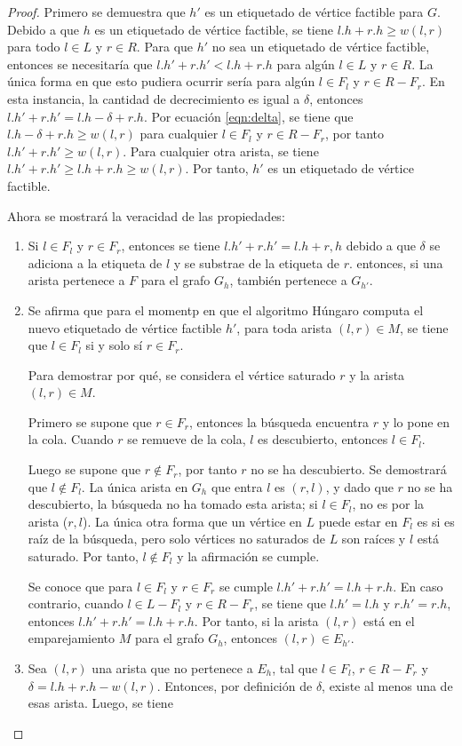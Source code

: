 \documentclass[10pt]{article} %
\begin{document}
	\begin{proof}
		Primero se demuestra que $h'$ es un etiquetado de v\'ertice factible para $G$. Debido a que $h$ es un etiquetado de v\'ertice factible, se tiene $l.h + r.h \geq w(l,r)$ para todo $l \in L$ y $r \in R$. Para que $h'$ no sea un etiquetado de v\'ertice factible, entonces se necesitar\'ia que $l.h' + r.h' < l.h + r.h$ para alg\'un $l \in L$ y $r \in R$. La \'unica forma en que esto pudiera ocurrir ser\'ia para alg\'un $l \in F_l$ y $r \in R-F_r$. En esta instancia, la cantidad de decrecimiento es igual a $\delta$, entonces $l.h' + r.h' = l.h - \delta + r.h$. Por ecuaci\'on \ref{eqn:delta}, se tiene que $l.h - \delta + r.h \geq w(l,r)$ para cualquier $l \in F_l$ y $r \in R - F_r$, por tanto $l.h' + r.h' \geq w(l,r)$. Para cualquier otra arista, se tiene $l.h' + r.h' \geq l.h + r.h \geq w(l,r)$. Por tanto, $h'$ es un etiquetado de v\'ertice factible.
		
		Ahora se mostrar\'a la veracidad de las propiedades:
		\begin{enumerate}
			\item Si $l \in F_l$ y $r \in F_r$, entonces se tiene $l.h' + r.h' = l.h + r,h$ debido a que $\delta$ se adiciona a la etiqueta de $l$ y se substrae de la etiqueta de $r$. entonces, si una arista pertenece a $F$ para el grafo $G_h$, tambi\'en pertenece a $G_{h'}$.
			\item Se afirma que para el momentp en que el algoritmo H\'ungaro computa el nuevo etiquetado de v\'ertice factible $h'$, para toda arista $(l,r) \in M$, se tiene que $l \in F_l$ si y solo s\'i $r \in F_r$. 
			
			Para demostrar por qu\'e, se considera el v\'ertice saturado $r$ y la arista $(l,r) \in M$. 
			
			Primero se supone que $r \in F_r$, entonces la b\'usqueda encuentra $r$ y lo pone en la cola. Cuando $r$ se remueve de la cola, $l$ es descubierto, entonces $l \in F_l$. 
			
			Luego se supone que $r \notin F_r$, por tanto $r$ no se ha descubierto. Se demostrar\'a que $l \notin F_l$. La \'unica arista en $G_h$ que entra $l$ es $(r,l)$, y dado que $r$ no se ha descubierto, la b\'usqueda no ha tomado esta arista; si $l \in F_l$, no es por la arista ($r,l$). La \'unica otra forma que un v\'ertice en $L$ puede estar en $F_l$ es si es ra\'iz de la b\'usqueda, pero solo v\'ertices no saturados de $L$ son ra\'ices y $l$ est\'a saturado. Por tanto, $l \notin F_l$ y la afirmaci\'on se cumple.
			
			Se conoce que para $l \in F_l$ y $r \in F_r$ se cumple $l.h' + r.h' = l.h + r.h$. En caso contrario, cuando $l \in L-F_l$ y $r \in R-F_r$, se tiene que $l.h' = l.h$ y $r.h'=r.h$, entonces $l.h' + r.h' = l.h + r.h$. Por tanto, si la arista $(l,r)$ est\'a en el emparejamiento $M$ para el grafo $G_h$, entonces $(l,r) \in E_{h'}$.
			\item Sea $(l,r)$ una arista que no pertenece a $E_h$, tal que $l \in F_l$, $r \in R-F_r$ y $\delta = l.h + r.h - w(l,r)$. Entonces, por definici\'on de $\delta$, existe al menos una de esas arista. Luego, se tiene 
			

\end{enumerate}
\end{proof}
\end{document}
